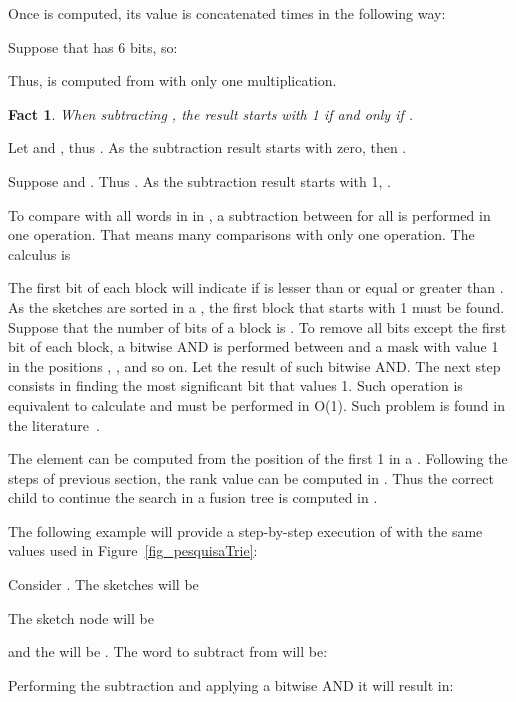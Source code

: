 \documentclass[11pt]{article}
\newtheorem{fato}{Fact}
\begin{document}
Once  is computed, its value is concatenated  times in the following way:


Suppose that  has 6 bits, so:
 


Thus,  is computed from  with only one multiplication.


\begin{fato}
When subtracting , the result starts with 1 if and only if .
\end{fato}

Let  and , thus . As the subtraction result starts with zero, then .




Suppose  and . Thus . As the subtraction result starts with 1, .


To compare  with all words in  in , a subtraction between  for all   is performed in one operation. That means many comparisons with only one operation.
The calculus is 



The first bit of each block will indicate if  is lesser than or equal or greater than . As the sketches are sorted in a , the first block that starts with 1 must be found. Suppose that the number of bits of a block  is . To remove all bits except the first bit of each block, a bitwise AND is performed between  and a mask with value 1 in the positions , ,  and so on. Let  the result of such bitwise AND. The next step consists in finding the most significant bit that values 1. Such operation is equivalent to calculate  and must be performed in O(1). Such problem is found in the literature~\cite{hackers}.





The element   can be computed from the position of the first 1 in a . Following the steps of previous section, the rank value can be computed in . Thus the correct child to continue the search in a fusion tree is computed in .

The following example will provide a step-by-step execution of  with the same values used in Figure~\ref{fig_pesquisaTrie}:


Consider . The sketches will be 



The sketch node will be

and the  will be . The word to subtract from   will be:


Performing the subtraction and applying a bitwise AND it will result in:
\end{document}
